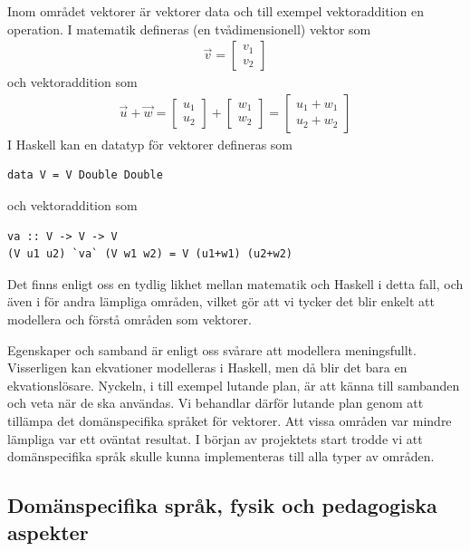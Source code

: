 Inom området vektorer är vektorer data och till exempel vektoraddition en operation. I matematik defineras (en tvådimensionell) vektor som
\begin{align*}
  \vec{v} = \begin{bmatrix}
              v_1 \\
              v_2
            \end{bmatrix}
\end{align*}
och vektoraddition som
\begin{align*}
  \vec{u} + \vec{w} = \begin{bmatrix}
                        u_1 \\
                        u_2
                      \end{bmatrix}
                    + \begin{bmatrix}
                        w_1 \\
                        w_2
                      \end{bmatrix}
                    = \begin{bmatrix}
                        u_1 + w_1 \\
                        u_2 + w_2
                      \end{bmatrix}
\end{align*}
I Haskell kan en datatyp för vektorer defineras som
\begin{lstlisting}
data V = V Double Double
\end{lstlisting}
och vektoraddition som
\begin{lstlisting}
va :: V -> V -> V
(V u1 u2) `va` (V w1 w2) = V (u1+w1) (u2+w2)
\end{lstlisting}
Det finns enligt oss en tydlig likhet mellan matematik och Haskell i detta fall, och även i för andra lämpliga områden, vilket gör att vi tycker det blir enkelt att modellera och förstå områden som vektorer.

Egenskaper och samband är enligt oss svårare att modellera meningsfullt. Visserligen kan ekvationer modelleras i Haskell, men då blir det bara en ekvationslösare. Nyckeln, i till exempel lutande plan, är att känna till sambanden och veta när de ska användas. Vi behandlar därför lutande plan genom att tillämpa det domänspecifika språket för vektorer. Att vissa områden var mindre lämpliga var ett oväntat resultat. I början av projektets start trodde vi att domänspecifika språk skulle kunna implementeras till alla typer av områden.

\subsection{Domänspecifika språk, fysik och pedagogiska aspekter}\label{sec:bara_fysik}

